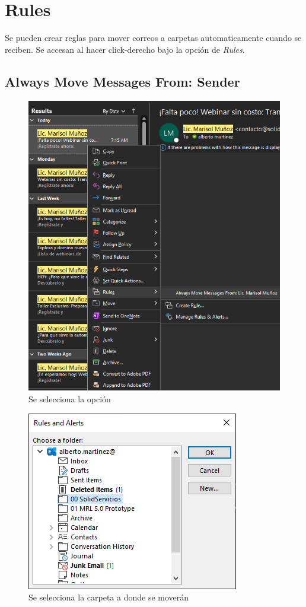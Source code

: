 \documentclass[12pt,letterpaper,final]{report}
\begin{document}
\chapter{Rules}

Se pueden crear reglas para mover correos a carpetas automaticamente cuando se reciben. Se accesan al hacer click-derecho bajo la opción de \emph{Rules}.

\section{Always Move Messages From: Sender}

\begin{figure}[H]
	\centering
	\includegraphics[width=0.85\linewidth, height=0.45\textheight,keepaspectratio]{Imagenes/outlook_rules01}
	\caption{Se selecciona la opción}
	\label{fig:outlookrules01}
\end{figure}

\begin{figure}[H]
	\centering
	\includegraphics[width=0.75\linewidth, height=0.35\textheight,keepaspectratio]{Imagenes/outlook_rules02}
	\caption{Se selecciona la carpeta a donde se moverán}
	\label{fig:outlookrules02}
\end{figure}
\end{document}

